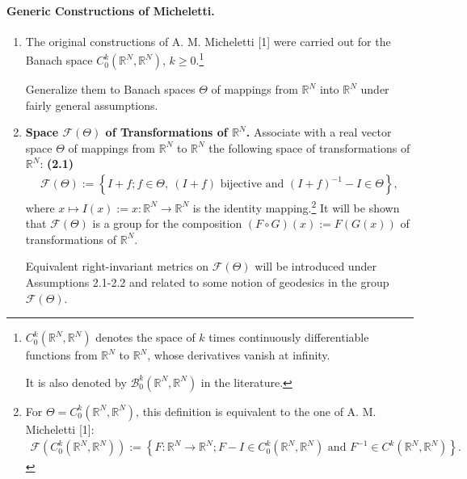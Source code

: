 \documentclass{book}
\numberwithin{equation}{section}
\begin{document}
\paragraph{Generic Constructions of Micheletti.}
\begin{enumerate}
    \item The original constructions of A. M. Micheletti [1] were carried out for the Banach space $C_0^k(\mathbb{R}^N,\mathbb{R}^N)$, $k\ge 0$.\footnote{$C_0^k(\mathbb{R}^N,\mathbb{R}^N)$ denotes the space of $k$ times continuously differentiable functions from $\mathbb{R}^N$ to $\mathbb{R}^N$, whose derivatives vanish at infinity.
        
        It is also denoted by $\mathcal{B}_0^k(\mathbb{R}^N,\mathbb{R}^N)$ in the literature.}
    
    Generalize them to Banach spaces $\Theta$ of mappings from $\mathbb{R}^N$ into $\mathbb{R}^N$ under fairly general assumptions.
    \item \textbf{Space $\mathcal{F}(\Theta)$ of Transformations of $\mathbb{R}^N$.} Associate with a real vector space $\Theta$ of mappings from $\mathbb{R}^N$ to $\mathbb{R}^N$ the following space of transformations of $\mathbb{R}^N$: \textbf{(2.1)}
    \begin{align*}
        \mathcal{F}(\Theta) := \left\{I + f;f\in\Theta,\ \left(I + f\right) \mbox{ bijective and } (I + f)^{-1} - I\in\Theta\right\},
    \end{align*}
    where $x\mapsto I(x) := x:\mathbb{R}^N\to\mathbb{R}^N$ is the identity mapping.\footnote{For $\Theta = C_0^k(\mathbb{R}^N,\mathbb{R}^N)$, this definition is equivalent to the one of A. M. Micheletti [1]:
        \begin{align*}
            \mathcal{F}\left(C_0^k(\mathbb{R}^N,\mathbb{R}^N)\right) := \left\{F:\mathbb{R}^N\to\mathbb{R}^N;F - I\in C_0^k(\mathbb{R}^N,\mathbb{R}^N) \mbox{ and } F^{-1}\in C^k(\mathbb{R}^N,\mathbb{R}^N)\right\}.
    \end{align*}}
    It will be shown that $\mathcal{F}(\Theta)$ is a group for the composition $(F\circ G)(x) := F(G(x))$ of transformations of $\mathbb{R}^N$.
    
    Equivalent right-invariant metrics on $\mathcal{F}(\Theta)$ will be introduced under Assumptions 2.1-2.2 and related to some notion of geodesics in the group $\mathcal{F}(\Theta)$.
    

\end{enumerate}
\end{document}
